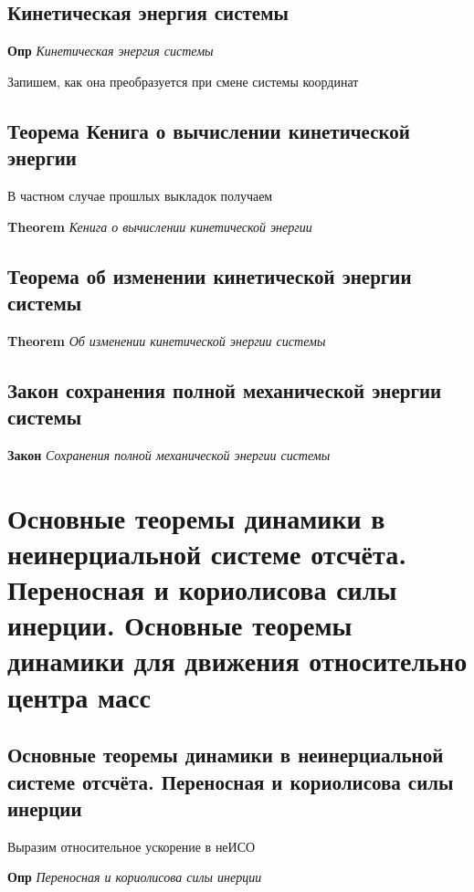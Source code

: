 \documentclass[a4paper, 14pt]{article}
\begin{document}
    \subsection{Кинетическая энергия системы}
    
    \textbf{Опр} \textit{Кинетическая энергия системы}
    
    Запишем, как она преобразуется при смене системы координат
    
    \subsection{Теорема Кенига о вычислении кинетической энергии}
    
    В частном случае прошлых выкладок получаем
    
    \textbf{Theorem} \textit{Кенига о вычислении кинетической энергии}
    
    \subsection{Теорема об изменении кинетической энергии системы}
    
    \textbf{Theorem} \textit{Об изменении кинетической энергии системы}
    
    \subsection{Закон сохранения полной механической энергии системы}
    
    \textbf{Закон} \textit{Сохранения полной механической энергии системы}
    
    \section{Основные теоремы динамики в неинерциальной системе отсчёта.
    Переносная и кориолисова силы инерции.
    Основные теоремы динамики для движения относительно центра масс}
    
    \subsection{Основные теоремы динамики в неинерциальной системе отсчёта. Переносная и кориолисова силы инерции}
    
    Выразим относительное ускорение в неИСО
    
    \textbf{Опр} \textit{Переносная и кориолисова силы инерции}
    
\end{document}
